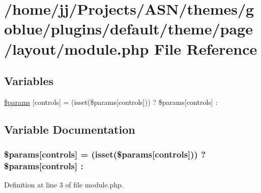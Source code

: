\hypertarget{module_8php}{}\section{/home/jj/\+Projects/\+A\+S\+N/themes/goblue/plugins/default/theme/page/layout/module.php File Reference}
\label{module_8php}
\subsection*{Variables}
\begin{DoxyCompactItemize}
\item 
\hyperlink{module_8php_a2d9a9b77327b93f68b2ca40209d8f58f}{\$params} \mbox{[}\textquotesingle{}controls\textquotesingle{}\mbox{]} = (isset(\$params\mbox{[}\textquotesingle{}controls\textquotesingle{}\mbox{]})) ? \$params\mbox{[}\textquotesingle{}controls\textquotesingle{}\mbox{]} \+: \textquotesingle{}\textquotesingle{}
\end{DoxyCompactItemize}


\subsection{Variable Documentation}
\subsubsection[{\texorpdfstring{\$params}{$params}}]{\setlength{\rightskip}{0pt plus 5cm}\$params\mbox{[}\textquotesingle{}controls\textquotesingle{}\mbox{]} = (isset(\$params\mbox{[}\textquotesingle{}controls\textquotesingle{}\mbox{]})) ? \$params\mbox{[}\textquotesingle{}controls\textquotesingle{}\mbox{]} \+: \textquotesingle{}\textquotesingle{}}\hypertarget{module_8php_a2d9a9b77327b93f68b2ca40209d8f58f}{}\label{module_8php_a2d9a9b77327b93f68b2ca40209d8f58f}


Definition at line 3 of file module.\+php.


